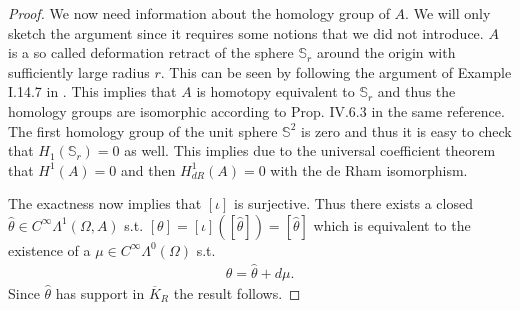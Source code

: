 \documentclass[../master_thesis.tex]{subfiles}
\begin{document}
\begin{proof}
    We now need information about the homology group of $A$. We will only sketch the argument 
    since it requires some notions that we did not introduce. 
    $A$ is a so called deformation retract of the sphere $\mathbb{S}_r$ around the origin
    with sufficiently large radius $r$. 
    This can be seen by following the argument of Example I.14.7 in \cite{topology_and_geometry}. This implies that
    $A$ is homotopy equivalent to $\mathbb{S}_r$ and thus the homology groups are 
    isomorphic according to Prop. IV.6.3 in the same reference. The first homology group of the unit sphere 
    $\mathbb{S}^2$ is zero and thus it is easy to check that $H_1(\mathbb{S}_r) = 0$
    as well.
    This implies due to the universal coefficient 
    theorem that $H^1(A) = 0$ and then $H^1_{dR}(A) = 0$ with the de Rham isomorphism. 
    
    The exactness now implies that 
    $[\iota]$ is surjective. Thus there exists a closed $\hat{\theta}\in C^\infty \Lambda^1(\Omega, A)$
    s.t. 
    $[\theta] = [\iota]([\hat{\theta}]) = [\hat{\theta}]$ which is equivalent to the 
    existence of a $\mu \in C^\infty \Lambda^0 (\Omega)$ s.t. 
    \begin{align*}
        \theta = \hat{\theta} + d\mu.
    \end{align*}
    Since $\hat{\theta}$ has support in $\overline{K}_R$ the result follows.
\end{proof}
\end{document}
